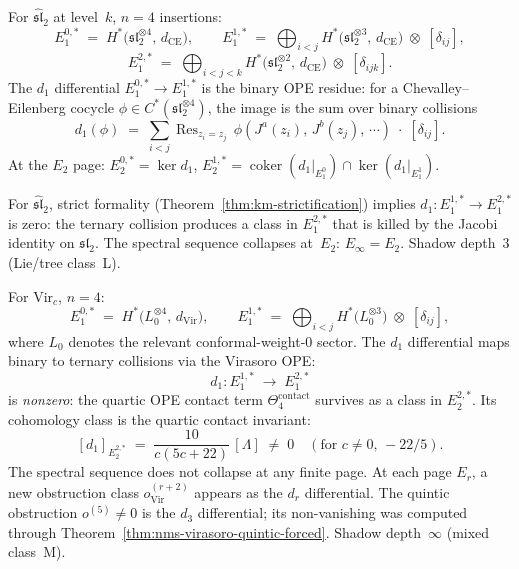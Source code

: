 \begin{computation}
\label{comp:holographic-ss-sl2}
For $\widehat{\mathfrak{sl}}_2$ at level~$k$, $n=4$ insertions:
\[
E_1^{0,*}
\;=\;
H^*\!\bigl(\mathfrak{sl}_2^{\otimes 4},\,d_{\mathrm{CE}}\bigr),
\qquad
E_1^{1,*}
\;=\;
\bigoplus_{i<j}
H^*\!\bigl(\mathfrak{sl}_2^{\otimes 3},\,d_{\mathrm{CE}}\bigr)
\;\otimes\;
[\delta_{ij}],
\]
\[
E_1^{2,*}
\;=\;
\bigoplus_{i<j<k}
H^*\!\bigl(\mathfrak{sl}_2^{\otimes 2},\,d_{\mathrm{CE}}\bigr)
\;\otimes\;
[\delta_{ijk}].
\]
The $d_1$ differential $E_1^{0,*}\to E_1^{1,*}$ is the binary
OPE residue: for a Chevalley--Eilenberg cocycle
$\phi\in C^*(\mathfrak{sl}_2^{\otimes 4})$, the image is the
sum over binary collisions
\[
d_1(\phi)
\;=\;
\sum_{i<j}
\operatorname{Res}_{z_i=z_j}\,
\phi(J^a(z_i),\,J^b(z_j),\,\cdots)
\;\cdot\;
[\delta_{ij}].
\]
At the $E_2$ page:
$E_2^{0,*}=\ker d_1$,
$E_2^{1,*}=\operatorname{coker}(d_1|_{E_1^0})
\cap\ker(d_1|_{E_1^1})$.

For $\widehat{\mathfrak{sl}}_2$, strict formality
(Theorem~\ref{thm:km-strictification}) implies
$d_1\colon E_1^{1,*}\to E_1^{2,*}$ is zero:
the ternary collision produces a class in
$E_1^{2,*}$ that is killed by the Jacobi identity on
$\mathfrak{sl}_2$. The spectral sequence collapses at~$E_2$:
$E_\infty = E_2$. Shadow depth~$3$ (Lie/tree class~L).
\end{computation}

\begin{computation}
\label{comp:holographic-ss-vir}
For $\mathrm{Vir}_c$, $n=4$:
\[
E_1^{0,*}
\;=\;
H^*\!\bigl(L_0^{\otimes 4},\,d_{\mathrm{Vir}}\bigr),
\qquad
E_1^{1,*}
\;=\;
\bigoplus_{i<j}
H^*\!\bigl(L_0^{\otimes 3}\bigr)
\;\otimes\;
[\delta_{ij}],
\]
where $L_0$ denotes the relevant conformal-weight-$0$
sector. The $d_1$ differential maps binary to ternary
collisions via the Virasoro OPE:
\[
d_1\colon
E_1^{1,*}\;\longrightarrow\;E_1^{2,*}
\]
is \emph{nonzero}: the quartic OPE contact term
$\Theta_4^{\mathrm{contact}}$ survives as a class in
$E_2^{2,*}$. Its cohomology class is the quartic contact
invariant:
\[
[d_1]_{E_2^{2,*}}
\;=\;
\frac{10}{c(5c+22)}\,[\Lambda]
\;\neq\;0
\quad(\text{for }c\neq 0,\,-22/5).
\]
The spectral sequence does not collapse at any finite page.
At each page $E_r$, a new obstruction class $o^{(r+2)}_{\mathrm{Vir}}$
appears as the $d_r$ differential. The quintic obstruction
$o^{(5)}\neq 0$ is the $d_3$ differential; its
non-vanishing was computed through
Theorem~\ref{thm:nms-virasoro-quintic-forced}.
Shadow depth~$\infty$ (mixed class~M).
\end{computation}

